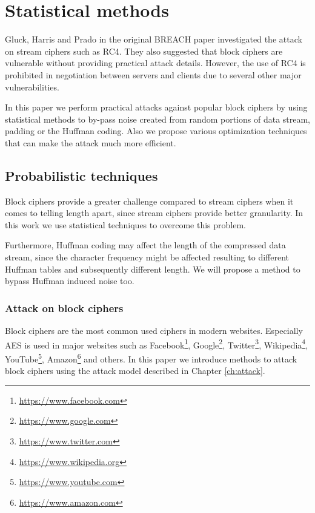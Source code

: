 \chapter{Statistical methods}\label{ch:statistic}

Gluck, Harris and Prado in the original BREACH paper investigated the attack
on stream ciphers such as RC4. They also suggested that block ciphers are
vulnerable without providing practical attack details. However, the use of RC4
is prohibited in negotiation between servers and clients
\cite{rc4_prohibit} due to several other major vulnerabilities.

In this paper we perform practical attacks against popular block ciphers by
using statistical methods to by-pass noise created from random portions of data
stream, padding or the Huffman coding. Also we propose various optimization
techniques that can make the attack much more efficient.

\section{Probabilistic techniques}\label{sec:probabilistic}

Block ciphers provide a greater challenge compared to stream ciphers when it
comes to telling length apart, since stream ciphers provide better granularity.
In this work we use statistical techniques to overcome this problem.

Furthermore, Huffman coding may affect the length of the compressed data stream,
since the character frequency might be affected resulting to different Huffman
tables and subsequently different length. We will propose a method to bypass
Huffman induced noise too.

\subsection{Attack on block ciphers}

Block ciphers are the most common used ciphers in modern websites. Especially
AES \cite{aes} is used in major websites such as
Facebook\footnote{\url{https://www.facebook.com}},
Google\footnote{\url{https://www.google.com}},
Twitter\footnote{\url{https://www.twitter.com}},
Wikipedia\footnote{\url{https://www.wikipedia.org}},
YouTube\footnote{\url{https://www.youtube.com}},
Amazon\footnote{\url{https://www.amazon.com}} and others. In this paper we
introduce methods to attack block ciphers using the attack model described in
Chapter \ref{ch:attack}.

